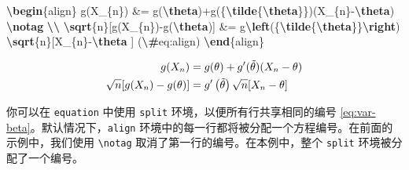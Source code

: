 \documentclass[
  12pt,
]{krantz}
\newenvironment{Shaded}{\begin{snugshade}}{\end{snugshade}}
\newcommand{\ExtensionTok}[1]{#1}
\newcommand{\KeywordTok}[1]{\textcolor[rgb]{0.13,0.29,0.53}{\textbf{#1}}}
\newcommand{\NormalTok}[1]{#1}
\newcommand{\SpecialCharTok}[1]{\textcolor[rgb]{0.81,0.36,0.00}{\textbf{#1}}}
\newcommand{\SpecialStringTok}[1]{\textcolor[rgb]{0.31,0.60,0.02}{#1}}
\theoremstyle{definition}
\theoremstyle{definition}
\theoremstyle{definition}
\theoremstyle{definition}
\theoremstyle{remark}
\begin{document}
\begin{Shaded}
\begin{Highlighting}[]
\KeywordTok{\textbackslash{}begin}\NormalTok{\{}\ExtensionTok{align}\NormalTok{\}}\SpecialStringTok{ }
\SpecialStringTok{g(X\_\{n\}) \&= g(}\SpecialCharTok{\textbackslash{}theta}\SpecialStringTok{)+g\textquotesingle{}(\{}\SpecialCharTok{\textbackslash{}tilde}\SpecialStringTok{\{}\SpecialCharTok{\textbackslash{}theta}\SpecialStringTok{\}\})(X\_\{n\}{-}}\SpecialCharTok{\textbackslash{}theta}\SpecialStringTok{) }\SpecialCharTok{\textbackslash{}notag}\SpecialStringTok{ }\SpecialCharTok{\textbackslash{}\textbackslash{}}
\SpecialCharTok{\textbackslash{}sqrt}\SpecialStringTok{\{n\}[g(X\_\{n\}){-}g(}\SpecialCharTok{\textbackslash{}theta}\SpecialStringTok{)] \&= g\textquotesingle{}}\SpecialCharTok{\textbackslash{}left}\SpecialStringTok{(\{}\SpecialCharTok{\textbackslash{}tilde}\SpecialStringTok{\{}\SpecialCharTok{\textbackslash{}theta}\SpecialStringTok{\}\}}\SpecialCharTok{\textbackslash{}right}\SpecialStringTok{)}
\SpecialStringTok{  }\SpecialCharTok{\textbackslash{}sqrt}\SpecialStringTok{\{n\}[X\_\{n\}{-}}\SpecialCharTok{\textbackslash{}theta}\SpecialStringTok{ ] (}\SpecialCharTok{\textbackslash{}\#}\SpecialStringTok{eq:align)}
\KeywordTok{\textbackslash{}end}\NormalTok{\{}\ExtensionTok{align}\NormalTok{\} }
\end{Highlighting}
\end{Shaded}

\begin{align}
g(X_{n}) &= g(\theta)+g'({\tilde{\theta}})(X_{n}-\theta) \notag \\
\sqrt{n}[g(X_{n})-g(\theta)] &= g'\left({\tilde{\theta}}\right)
  \sqrt{n}[X_{n}-\theta ] \label{eq:align}
\end{align}

你可以在 \texttt{equation} 中使用 \texttt{split} 环境，以便所有行共享相同的编号 \eqref{eq:var-beta}。默认情况下，\texttt{align} 环境中的每一行都将被分配一个方程编号。在前面的示例中，我们使用 \texttt{\textbackslash{}notag} 取消了第一行的编号。在本例中，整个 \texttt{split} 环境被分配了一个编号。
\end{document}
